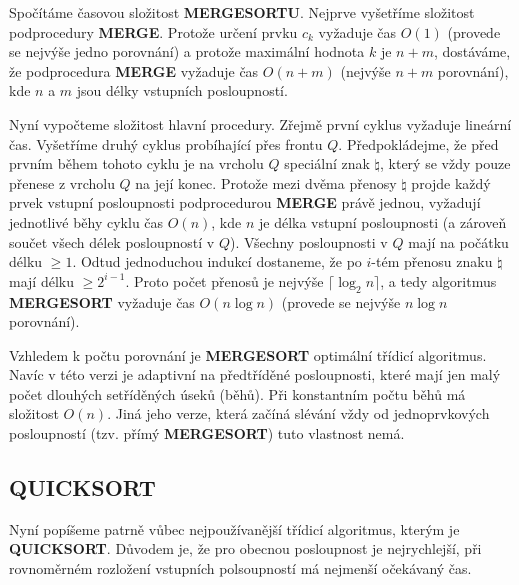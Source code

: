 \documentclass[a4paper,12pt]{article}
\begin{document}
Spočítáme časovou složitost {\bf MERGESORTU}. 
Nejprve vyšetříme slo\-ži\-tost podprocedury {\bf MER\-GE}. Protože 
určení prvku $c_k$ vyža\-du\-je čas $O(1)$ (provede se 
nejvýše jedno porovnání) a 
protože maximální hodnota $k$ je $n+m$, dostáváme, že 
podprocedura {\bf MERGE} vyžaduje čas $O(n+m)$ (nejvýše $
n+m$ 
porovnání), kde $n$ a $m$ jsou délky vstupních posloupností.

Nyní vypočteme složitost hlavní procedury. 
Zřejmě první cyklus vyžaduje lineární čas. Vyšetříme 
druhý cyklus probíhající přes frontu $Q$. Předpokládejme, že před prvním během 
tohoto cyklu je na vrcholu $Q$ speciální znak $\natural$, který se vždy 
pouze přenese z vrcholu $Q$ na její konec. Protože mezi dvěma 
přenosy $\natural$ projde každý prvek vstupní posloupnosti 
podprocedurou {\bf MERGE} právě jednou, vyžadují jednotlivé běhy cyklu 
čas $O(n)$, kde 
$n$ je délka vstupní posloupnosti (a zároveň součet všech délek 
posloupností v $Q$). Všech\-ny posloupnosti v $Q$ mají  
na počátku délku $\ge 1$. Odtud jednoduchou indukcí 
dostaneme, že po $i$-tém přenosu znaku $\natural$ mají 
délku $\ge 2^{i-1}$. Proto počet přenosů je 
nejvýše $\lceil\log_2n\rceil$, a tedy algoritmus {\bf MERGESORT }
vyžaduje čas $O(n\log n)$ (provede se nejvýše $n\log n$ 
porovnání).

Vzhledem k 
počtu porovnání je {\bf MERGESORT} optimální třídicí algoritmus. 
Navíc v této verzi je adaptivní na předtříděné 
posloupnosti, které mají jen malý počet dlouhých 
setříděných úseků (běhů). Při 
konstantním počtu běhů má složitost $O(n)$. Jiná 
jeho verze, která začíná slévání vždy od 
jednoprvkových posloupností (tzv. přímý {\bf MERGESORT}) 
tuto vlastnost nemá. 

\subsection{
QUICKSORT
}

Nyní popíšeme patrně vůbec 
nejpoužívanější třídicí algoritmus, kterým je {\bf QUICKSORT}. 
Důvodem je, že pro obecnou posloupnost je 
nejrychlejší, při rovnoměrném rozložení vstupních 
polsoupností má nejmenší očekávaný čas. 
\end{document}
